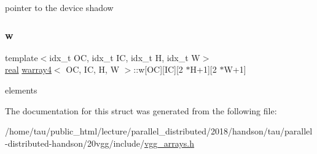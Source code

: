 pointer to the device shadow \mbox{\label{structwarray4_a00b05df2c80beb4b1ab96c3b0fbc4550}} 
\subsubsection{\texorpdfstring{w}{w}}
{\footnotesize\ttfamily template$<$idx\+\_\+t OC, idx\+\_\+t IC, idx\+\_\+t H, idx\+\_\+t W$>$ \\
\hyperlink{vgg__util_8h_a1082d08aaa761215ec83e7149f27ad16}{real} \hyperlink{structwarray4}{warray4}$<$ OC, IC, H, W $>$\+::w\mbox{[}OC\mbox{]}\mbox{[}IC\mbox{]}\mbox{[}2 $\ast$H+1\mbox{]}\mbox{[}2 $\ast$W+1\mbox{]}}

elements 

The documentation for this struct was generated from the following file\+:\begin{DoxyCompactItemize}
\item 
/home/tau/public\+\_\+html/lecture/parallel\+\_\+distributed/2018/handson/tau/parallel-\/distributed-\/handson/20vgg/include/\hyperlink{vgg__arrays_8h}{vgg\+\_\+arrays.\+h}\end{DoxyCompactItemize}
